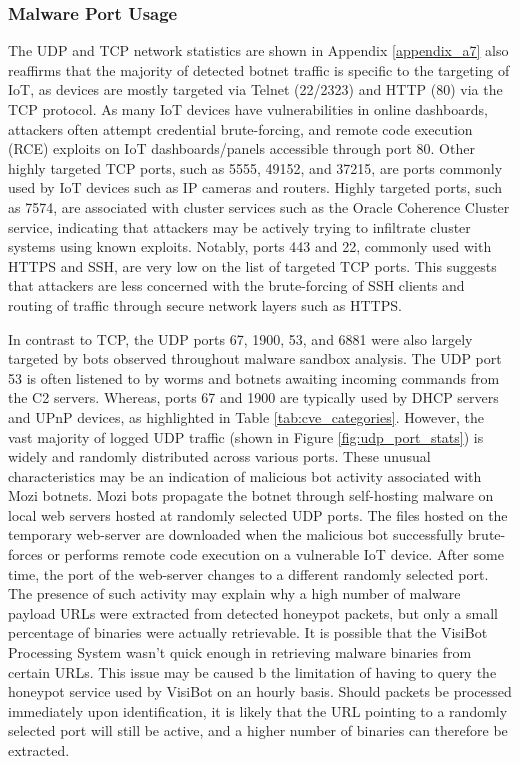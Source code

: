 \subsubsection{Malware Port Usage}

The UDP and TCP network statistics are shown in Appendix \ref{appendix_a7} also reaffirms that the majority of detected botnet traffic is specific to the targeting of IoT, as devices are mostly targeted via Telnet (22/2323) and HTTP (80) via the TCP protocol. As many IoT devices have vulnerabilities in online dashboards, attackers often attempt credential brute-forcing, and remote code execution (RCE) exploits on IoT dashboards/panels accessible through port 80. Other highly targeted TCP ports, such as 5555, 49152, and 37215, are ports commonly used by IoT devices such as IP cameras and routers. Highly targeted ports, such as 7574, are associated with cluster services such as the Oracle Coherence Cluster service, indicating that attackers may be actively trying to infiltrate cluster systems using known exploits. Notably, ports 443 and 22, commonly used with HTTPS and SSH, are very low on the list of targeted TCP ports. This suggests that attackers are less concerned with the brute-forcing of SSH clients and routing of traffic through secure network layers such as HTTPS.

In contrast to TCP, the UDP ports 67, 1900, 53, and 6881 were also largely targeted by bots observed throughout malware sandbox analysis. The UDP port 53 is often listened to by worms and botnets awaiting incoming commands from the C2 servers. \citep{SpeedguidePort53} Whereas, ports 67 and 1900 are typically used by DHCP servers and UPnP devices, as highlighted in Table \ref{tab:cve_categories}. However, the vast majority of logged UDP traffic (shown in Figure \ref{fig:udp_port_stats}) is widely and randomly distributed across various ports. These unusual characteristics may be an indication of malicious bot activity associated with Mozi botnets. Mozi bots propagate the botnet through self-hosting malware on local web servers hosted at randomly selected UDP ports. The files hosted on the temporary web-server are downloaded when the malicious bot successfully brute-forces or performs remote code execution on a vulnerable IoT device. After some time, the port of the web-server changes to a different randomly selected port. The presence of such activity may explain why a high number of malware payload URLs were extracted from detected honeypot packets, but only a small percentage of binaries were actually retrievable. It is possible that the VisiBot Processing System wasn't quick enough in retrieving malware binaries from certain URLs. This issue may be caused b the limitation of having to query the honeypot service used by VisiBot on an hourly basis. Should packets be processed immediately upon identification, it is likely that the URL pointing to a randomly selected port will still be active, and a higher number of binaries can therefore be extracted.

